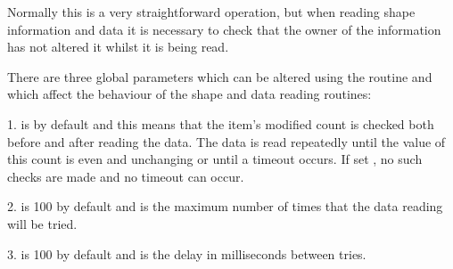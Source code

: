       Normally this is a very straightforward operation, but when reading
      shape information and data it is necessary to check that the owner of
      the information has not altered it whilst it is being read.

      There are three global parameters which can be altered using the
      {} routine and which affect the behaviour %
of the
      shape and data reading routines:

      1. {} is {} by default and this means %
that the item's
         modified count is checked both before and after reading the data. The
         data is read repeatedly until the value of this count is even and
         unchanging or until a timeout occurs. If set {}, no %
such checks are
         made and no timeout can occur.

      2. {} is 100 by default and is the maximum number %
of times
         that the data reading will be tried.

      3. {} is 100 by default and is the delay in %
milliseconds
         between tries.

